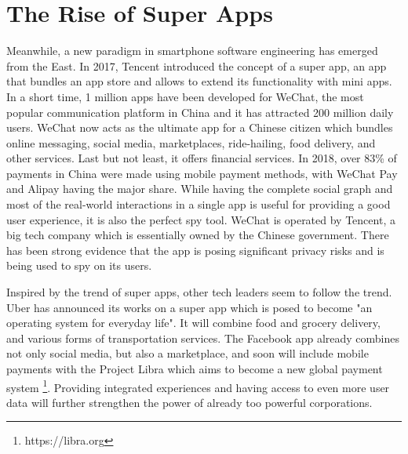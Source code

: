 \section{The Rise of Super Apps}

Meanwhile, a new paradigm in smartphone software engineering has emerged from the East. In 2017, Tencent introduced the concept of a super app, an app that bundles an app store and allows to extend its functionality with mini apps. In a short time, 1 million apps have been developed for WeChat, the most popular communication platform in China and it has attracted 200 million daily users. \cite{wechatapps} WeChat now acts as the ultimate app for a Chinese citizen which bundles online messaging, social media, marketplaces, ride-hailing, food delivery, and other services. Last but not least, it offers financial services. In 2018, over 83\% of payments in China were made using mobile payment methods, with WeChat Pay and Alipay having the major share. \cite{chinapayments} While having the complete social graph and most of the real-world interactions in a single app is useful for providing a good user experience, it is also the perfect spy tool. WeChat is operated by Tencent, a big tech company which is essentially owned by the Chinese government. There has been strong evidence that the app is posing significant privacy risks and is being used to spy on its users. \cite{wechatspy}

Inspired by the trend of super apps, other tech leaders seem to follow the trend. Uber has announced its works on a super app which is posed to become "an operating system for everyday life". It will combine food and grocery delivery, and various forms of transportation services. \cite{superuber} The Facebook app already combines not only social media, but also a marketplace, and soon will include mobile payments with the Project Libra which aims to become a new global payment system \footnote{https://libra.org}. Providing integrated experiences and having access to even more user data will further strengthen the power of already too powerful corporations.



